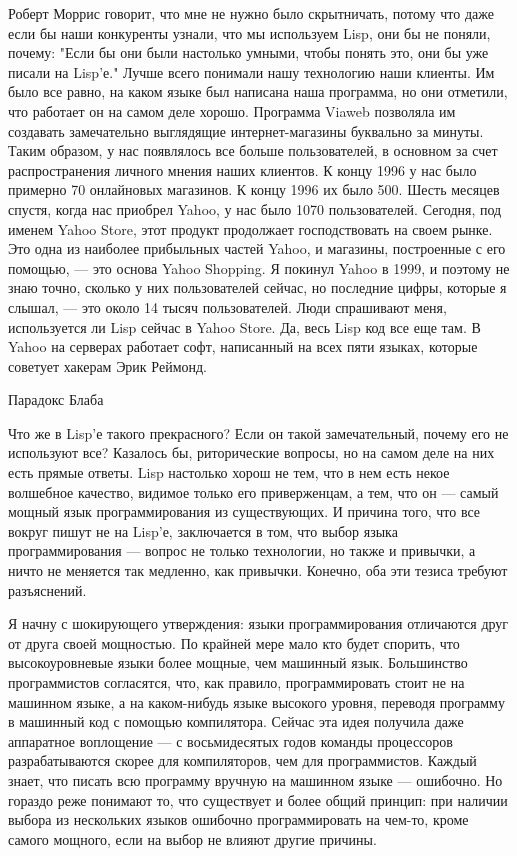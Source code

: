 \documentclass[ebook,12pt,oneside,openany]{memoir}
\begin{document}
Роберт Моррис говорит, что мне не нужно было скрытничать, потому что
даже если бы наши конкуренты узнали, что мы используем Lisp, они бы не
поняли, почему: "Если бы они были настолько умными, чтобы понять это,
они бы уже писали на Lisp'е." Лучше всего понимали нашу технологию
наши клиенты. Им было все равно, на каком языке был написана наша
программа, но они отметили, что работает он на самом деле хорошо.
Программа Viaweb позволяла им создавать замечательно выглядящие
интернет-магазины буквально за минуты. Таким образом, у нас появлялось
все больше пользователей, в основном за счет распространения личного
мнения наших клиентов. К концу 1996 у нас было примерно 70 онлайновых
магазинов. К концу 1996 их было 500. Шесть месяцев спустя, когда нас
приобрел Yahoo, у нас было 1070 пользователей. Сегодня, под именем
Yahoo Store, этот продукт продолжает господствовать на своем рынке.
Это одна из наиболее прибыльных частей Yahoo, и магазины, построенные
с его помощью, — это основа Yahoo Shopping. Я покинул Yahoo в 1999, и
поэтому не знаю точно, сколько у них пользователей сейчас, но
последние цифры, которые я слышал, — это около 14 тысяч пользователей.
Люди спрашивают меня, используется ли Lisp сейчас в Yahoo Store. Да,
весь Lisp код все еще там. В Yahoo на серверах работает софт,
написанный на всех пяти языках, которые советует хакерам Эрик Реймонд.

Парадокс Блаба

Что же в Lisp'е такого прекрасного? Если он такой замечательный,
почему его не используют все? Казалось бы, риторические вопросы, но на
самом деле на них есть прямые ответы. Lisp настолько хорош не тем, что
в нем есть некое волшебное качество, видимое только его приверженцам,
а тем, что он — самый мощный язык программирования из существующих. И
причина того, что все вокруг пишут не на Lisp'е, заключается в том,
что выбор языка программирования — вопрос не только технологии, но
также и привычки, а ничто не меняется так медленно, как привычки.
Конечно, оба эти тезиса требуют разъяснений.

Я начну с шокирующего утверждения: языки программирования отличаются
друг от друга своей мощностью. По крайней мере мало кто будет спорить,
что высокоуровневые языки более мощные, чем машинный язык. Большинство
программистов согласятся, что, как правило, программировать стоит не
на машинном языке, а на каком-нибудь языке высокого уровня, переводя
программу в машинный код с помощью компилятора. Сейчас эта идея
получила даже аппаратное воплощение — с восьмидесятых годов команды
процессоров разрабатываются скорее для компиляторов, чем для
программистов. Каждый знает, что писать всю программу вручную на
машинном языке — ошибочно. Но гораздо реже понимают то, что существует
и более общий принцип: при наличии выбора из нескольких языков
ошибочно программировать на чем-то, кроме самого мощного, если на
выбор не влияют другие причины.
\end{document}
